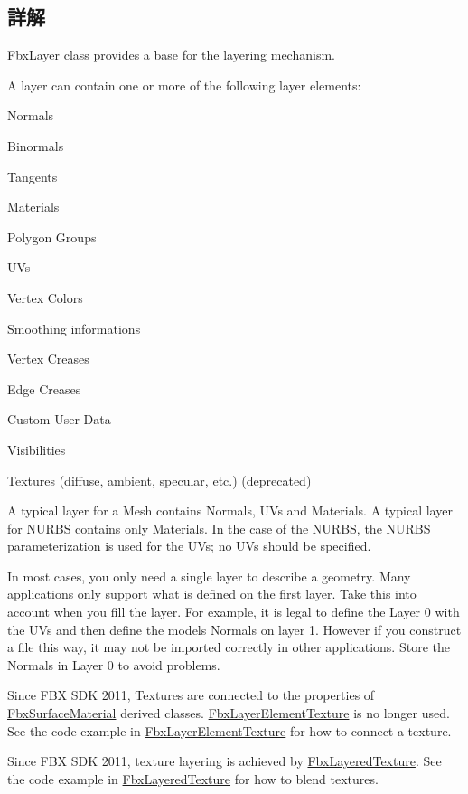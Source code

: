 \subsection{詳解}
\hyperlink{class_fbx_layer}{Fbx\+Layer} class provides a base for the layering mechanism.

A layer can contain one or more of the following layer elements\+: \begin{DoxyItemize}
\item Normals \item Binormals \item Tangents \item Materials \item Polygon Groups \item U\+Vs \item Vertex Colors \item Smoothing informations \item Vertex Creases \item Edge Creases \item Custom User Data \item Visibilities \item Textures (diffuse, ambient, specular, etc.) (deprecated)\end{DoxyItemize}
A typical layer for a Mesh contains Normals, U\+Vs and Materials. A typical layer for N\+U\+R\+BS contains only Materials. In the case of the N\+U\+R\+BS, the N\+U\+R\+BS\textquotesingle{} parameterization is used for the U\+Vs; no U\+Vs should be specified.

In most cases, you only need a single layer to describe a geometry. Many applications only support what is defined on the first layer. Take this into account when you fill the layer. For example, it is legal to define the Layer 0 with the U\+Vs and then define the model\textquotesingle{}s Normals on layer 1. However if you construct a file this way, it may not be imported correctly in other applications. Store the Normals in Layer 0 to avoid problems.

Since F\+BX S\+DK 2011, Textures are connected to the properties of \hyperlink{class_fbx_surface_material}{Fbx\+Surface\+Material} derived classes. \hyperlink{class_fbx_layer_element_texture}{Fbx\+Layer\+Element\+Texture} is no longer used. See the code example in \hyperlink{class_fbx_layer_element_texture}{Fbx\+Layer\+Element\+Texture} for how to connect a texture.

Since F\+BX S\+DK 2011, texture layering is achieved by \hyperlink{class_fbx_layered_texture}{Fbx\+Layered\+Texture}. See the code example in \hyperlink{class_fbx_layered_texture}{Fbx\+Layered\+Texture} for how to blend textures.

